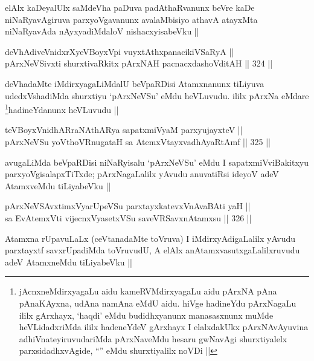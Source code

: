 \begin{artha}
elAlx kaDeyalUlx saMdeVha paDuva padAthaRvanunx beVre kaDe niNaRyavAgiruva parxyoVgavanunx avalaMbisiyo athavA atayxMta niNaRyavAda nAyxyadiMdaloV nishacxyisabeVku ||
\end{artha}


\begin{shl}
deVhAdiveVnidxrXyeVBoyxV\s pi vuyxtAthxpanacikiVSaRyA || \\
pArxNeVSivxti shurxtivaRkitx pArxNAH pacnacxdashoVditAH ||  324 ||  
\end{shl}

\begin{artha}
deVhadaMte iMdirxyagaLiMdalU beVpaRDisi Atamxnanunx tiLiyuva udedxVshadiMda shurxtiyu `pArxNeVSu' eMdu heVLuvudu. ililx pArxNa eMdare \footnote{jAcnxneMdirxyagaLu aidu kameRVMdirxyagaLu aidu pArxNA pAna pAnaKAyxna, udAna namAna eMdU aidu. hiVge hadineYdu pArxNagaLu ililx gArxhayx, `haqdi' eMdu budidhxyanunx manasasxnunx muMde heVLidadxriMda ililx hadeneYdeV gArxhayx I elalxdakUkx pArxNAvAyuvina adhiVnateyiruvudariMda pArxNaveMdu hesaru gwNavAgi shurxtiyalelx parxsidadhxvAgide, ``\stext'' eMdu shurxtiyalilx noVDi ||}hadineYdanunx heVLuvudu ||
\end{artha}

\begin{shl}
teVBoyxVnidhARraNAthARya sapatxmiVyaM parxyujayxteV ||  \\
pArxNeVSu yoV\s thoVR\s nugataH sa AtemxVtayxvadhAyaRtAmf ||  325 ||  
\end{shl}

\begin{artha}
avugaLiMda beVpaRDisi niNaRyisalu `pArxNeVSu' eMdu I sapatxmiVviBakitxyu parxyoVgisalapxTiTxde; pArxNagaLalilx yAvudu anuvatiRsi ideyoV adeV AtamxveMdu tiLiyabeVku ||
\end{artha}

\begin{shl}
pArxNeVSAvxtimxVyarUpeVSu parxtayxkatevxVnAvaBAti yaH || \\
sa EvA\s \s temxVti vijecnxVyasetxVSu saveVRSavxnAtamxsu ||  326 ||  
\end{shl}

\begin{artha}
Atamxna rUpavuLaLx (ceVtanadaMte toVruva) I iMdirxyAdigaLalilx yAvudu parxtayxtf savxrUpadiMda toVruvudU, A elAlx anAtamxvasutxgaLalilxruvudu adeV AtamxneMdu tiLiyabeVku ||
\end{artha}


